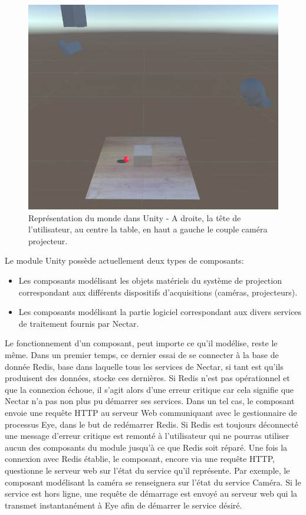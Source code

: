 \begin{figure}[H]
\centering
\includegraphics[width=0.65\linewidth]{images/unityscene}
\caption{Représentation du monde dans Unity - A droite, la tête de l'utilisateur, au centre la table, en haut a gauche le couple caméra projecteur.}
\label{fig:unityrealworld}
\end{figure}

Le module Unity possède actuellement deux types de composants:
\begin{itemize}
\item Les composants modélisant les objets matériels du système de projection correspondant aux différents dispositifs d'acquisitions (caméras, projecteurs).
\item Les composants modélisant la partie logiciel correspondant aux divers services de traitement fournis par Nectar.
\end{itemize}

Le fonctionnement d'un composant, peut importe ce qu'il modélise, reste le même. Dans un premier temps, ce dernier essai de se connecter à la base de donnée Redis, base dans laquelle tous les services de Nectar, si tant est qu'ils produisent des données, stocke ces dernières. Si Redis n'est pas opérationnel et que la connexion échoue, il s'agit alors d'une erreur critique car cela signifie que Nectar n'a pas non plus pu démarrer ses services. Dans un tel cas, le composant envoie une requête HTTP au serveur Web communiquant avec le gestionnaire de processus Eye, dans le but de redémarrer Redis. Si Redis est toujours déconnecté une message d'erreur critique est remonté à l'utilisateur qui ne pourras utiliser aucun des composants du module jusqu'à ce que Redis soit réparé.
Une fois la connexion avec Redis établie, le composant, encore via une requête HTTP, questionne le serveur web sur l'état du service qu'il représente. Par exemple, le composant modélisant la caméra se renseignera sur l'état du service Caméra. Si le service est hors ligne, une requête de démarrage est envoyé au serveur web qui la transmet instantanément à Eye afin de démarrer le service désiré. 

